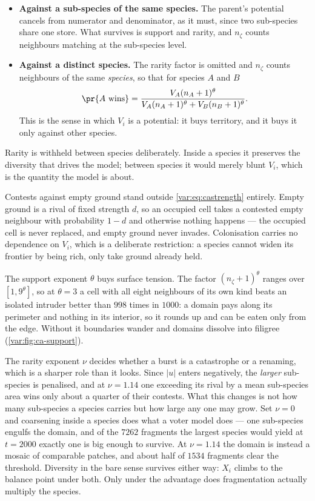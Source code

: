 \begin{itemize}[leftmargin=1.6em,itemsep=0.3em,topsep=0.3em]
\item \textbf{Against a sub-species of the same species.} The parent's
potential cancels from numerator and denominator, as it must, since two
sub-species share one store. What survives is support and rarity, and
$n_\zeta$ counts neighbours matching at the sub-species level.
\item \textbf{Against a distinct species.} The rarity factor is omitted and
$n_\zeta$ counts neighbours of the same \emph{species}, so that for species
$A$ and $B$
\begin{equation}
\pr{A\text{ wins}}=\frac{V_A(n_A+1)^{\theta}}
{V_A(n_A+1)^{\theta}+V_B(n_B+1)^{\theta}} .
\label{var:eq:catypeIII}
\end{equation}
This is the sense in which $V_i$ is a potential: it buys territory, and it
buys it only against other species.
\end{itemize}

Rarity is withheld between species deliberately. Inside a species it
preserves the diversity that drives the model; between species it would
merely blunt $V_i$, which is the quantity the model is about.

Contests against empty ground stand outside \cref{var:eq:castrength}
entirely. Empty ground is a rival of fixed strength $d$, so an occupied cell
takes a contested empty neighbour with probability $1-d$ and otherwise
nothing happens --- the occupied cell is never replaced, and empty ground
never invades. Colonisation carries no dependence on $V_i$, which is a
deliberate restriction: a species cannot widen its frontier by being rich,
only take ground already held.

The support exponent $\theta$ buys surface tension. The factor
$(n_\zeta+1)^\theta$ ranges over $[1,9^\theta]$, so at $\theta=3$ a cell with
all eight neighbours of its own kind beats an isolated intruder better than
$998$ times in $1000$: a domain pays along its perimeter and nothing in its
interior, so it rounds up and can be eaten only from the edge. Without it
boundaries wander and domains dissolve into filigree
(\cref{var:fig:ca-support}).

The rarity exponent $\nu$ decides whether a burst is a catastrophe or a
renaming, which is a sharper role than it looks. Since $|u|$ enters
negatively, the \emph{larger} sub-species is penalised, and at $\nu=1.14$ one
exceeding its rival by a mean sub-species area wins only about a quarter of
their contests. What this changes is not how many sub-species a species
carries but how large any one may grow. Set $\nu=0$ and coarsening inside a
species does what a voter model does --- one sub-species engulfs the domain,
and of the $7262$ fragments the largest species would yield at $t=2000$
exactly one is big enough to survive. At $\nu=1.14$ the domain is instead a
mosaic of comparable patches, and about half of $1534$ fragments clear the
threshold. Diversity in the bare sense survives either way: $X_i$ climbs to
the balance point under both. Only under the advantage does fragmentation
actually multiply the species.

